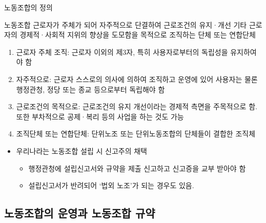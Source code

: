 \documentclass[aspectratio=169,xcolor=dvipsnames,handout]{beamer}
\begin{document}
\begin{frame}[allowframebreaks]{노동조합의 정의}
    \begin{block}{노동조합}
        근로자가 주체가 되어 자주적으로 단결하여  근로조건의 유지·개선 기타 근로자의 경제적·사회적 지위의 향상을 도모함을 목적으로 조직하는 단체 또는 연합단체
    \end{block}
    \begin{enumerate}[<+->]
        \item 근로자 주체 조직: 근로자 이외의 제3자, 특히 사용자로부터의 독립성을 유지하여야 함
        \item 자주적으로: 근로자 스스로의 의사에 의하여 조직하고 운영에 있어 사용자는 물론 행정관청, 정당 또는 종교 등으로부터 독립해야 함
    \framebreak\relax
        \item 근로조건의 목적으로: 근로조건의 유지 개선이라는 경제적 측면을 주목적으로 함. 또한 부차적으로 공제·복리 등의 사업을 하는 것도 가능
        \item 조직단체 또는 연합단체: 단위노조 또는 단위노동조합의 단체들이 결합한 조직체
    \end{enumerate}
    \begin{itemize}[<+->]
        \item 우리나라는 노동조합 설립 시 신고주의 채택
        \begin{itemize}[<+->]
            \item 행정관청에 설립신고서와 규약을 제출 신고하고 신고증을 교부 받아야 함
            \item 설립신고서가 반려되어 `법외 노조'가 되는 경우도 있음. 
        \end{itemize}
    \end{itemize}
\end{frame}

\subsection{노동조합의 운영과 노동조합 규약}
\end{document}
